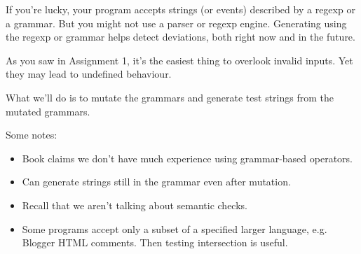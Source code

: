 \documentclass[11pt]{article}
\begin{document}
If you're lucky, your program accepts strings (or events) described by a regexp or a grammar. But you might not use a parser or regexp engine. Generating using the regexp or grammar helps detect deviations, both right now and in the future.

As you saw in Assignment 1, it's the easiest thing to overlook invalid inputs. Yet they may lead to undefined behaviour.

What we'll do is to mutate the grammars and generate test strings from the mutated grammars.

Some notes:
\begin{itemize}
\item Book claims we don't have much experience using grammar-based operators.
\item Can generate strings still in the grammar even after mutation.
\item Recall that we aren't talking about semantic checks.
\item Some programs accept only a subset of a specified larger language,
e.g. Blogger HTML comments. Then testing intersection is useful.
\end{itemize}
\end{document}
